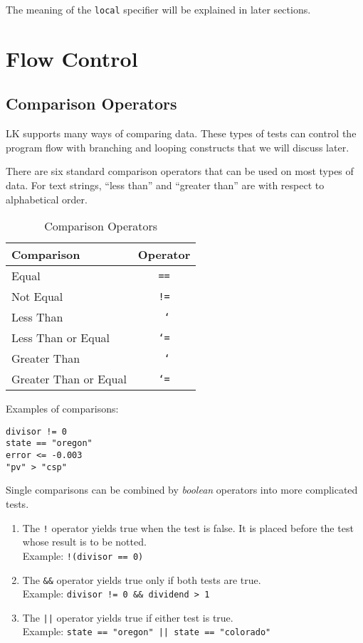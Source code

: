 \documentclass{article}
\newcommand\lt{\char`\<}
\newcommand\gt{\char`\>}
\begin{document}
The meaning of the \texttt{local} specifier will be explained in later sections.

\section{Flow Control}

\subsection{Comparison Operators}

LK supports many ways of comparing data.  These types of tests can control the program flow with branching and looping constructs that we will discuss later.

There are six standard comparison operators that can be used on most types of data.  For text strings, ``less than'' and ``greater than'' are with respect to alphabetical order.

\begin{table}[ht]
\begin{center}
\begin{tabular}{lc}
Comparison & Operator\\
\hline
Equal & \texttt{ == } \\
Not Equal & \texttt{ != }  \\
Less Than & \texttt{ \lt }  \\
Less Than or Equal & \texttt{ \lt= } \\
Greater Than & \texttt{ \gt } \\
Greater Than or Equal & \texttt{ \gt= } \\
\end{tabular}
\caption{Comparison Operators}
\label{tab_compop}
\end{center}
\end{table}

Examples of comparisons:

\begin{verbatim}
divisor != 0
state == "oregon"
error <= -0.003
"pv" > "csp"
\end{verbatim}

Single comparisons can be combined by \emph{boolean} operators into more complicated tests.

\begin{enumerate}
\item The \texttt{!} operator yields true when the test is false.  It is placed before the test whose result is to be notted.\\Example: \texttt{!(divisor == 0)}
\item The \texttt{\&\&} operator yields true only if both tests are true.\\Example: \texttt{divisor != 0 \&\& dividend > 1}
\item The \texttt{||} operator yields true if either test is true.\\Example: \texttt{state == "oregon" || state == "colorado"}
\end{enumerate}
\end{document}
